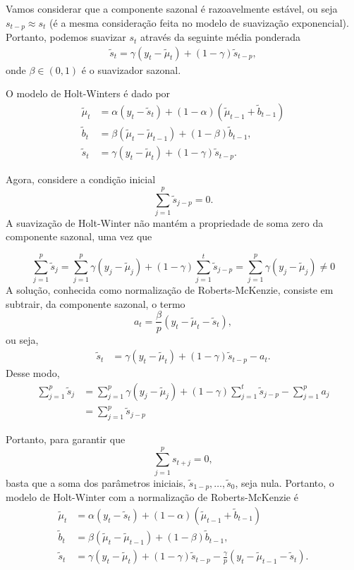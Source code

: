 \documentclass[
  letterpaper,
  DIV=11,
  numbers=noendperiod]{scrartcl}
\theoremstyle{plain}
\theoremstyle{plain}
\theoremstyle{definition}
\theoremstyle{definition}
\theoremstyle{remark}
\begin{document}
Vamos considerar que a componente sazonal é razoavelmente estável, ou
seja \(s_{t-p}\approx s_t\) (é a mesma consideração feita no modelo de
suavização exponencial). Portanto, podemos suavizar \(s_t\) através da
seguinte média ponderada \[\begin{align*}
    \tilde{s}_t = \gamma (y_t - \tilde{\mu}_t) + (1-\gamma) \tilde{s}_{t-p},
    \end{align*}\] onde \(\beta\in(0,1)\) é o suavizador sazonal.

O modelo de Holt-Winters é dado por \[\begin{align*}
    \tilde{\mu}_t &=\alpha (y_t - \tilde{s}_t) + (1-\alpha) (\tilde{\mu}_{t-1}+ \tilde{b}_{t-1}) \\
        \tilde{b}_t &= \beta (\tilde{\mu}_t - \tilde{\mu}_{t-1}) + (1-\beta) \tilde{b}_{t-1}
,\\
    \tilde{s}_t &= \gamma (y_t - \tilde{\mu}_t) + (1-\gamma) \tilde{s}_{t-p}.
    \end{align*}\]

Agora, considere a condição inicial \[\sum_{j=1}^p \tilde{s}_{j-p}=0.\]
A suavização de Holt-Winter não mantém a propriedade de soma zero da
componente sazonal, uma vez que

\[\sum_{j=1}^p \tilde{s}_{j}=\sum_{j=1}^p\gamma(y_j-\tilde{\mu}_j)+(1-\gamma)\sum_{j=1}^t\tilde{s}_{j-p}=\sum_{j=1}^p\gamma(y_j-\tilde{\mu}_j)\neq 0\]
A solução, conhecida como normalização de Roberts-McKenzie, consiste em
subtrair, da componente sazonal, o termo
\[a_t=\frac{\beta}{p}(y_t-\tilde{\mu}_t-\tilde{s}_t),\] ou seja,
\[\begin{align}\tilde{s}_t &= \gamma (y_t - \tilde{\mu}_t) + (1-\gamma) \tilde{s}_{t-p}-a_t.
\end{align}\] Desse modo,
\[\begin{align}\sum_{j=1}^p \tilde{s}_{j}&=\sum_{j=1}^p\gamma(y_j-\tilde{\mu}_j)+(1-\gamma)\sum_{j=1}^t\tilde{s}_{j-p}-\sum_{j=1}^p a_j\\&=\sum_{j=1}^p\tilde{s}_{j-p}\end{align}\]

Portanto, para garantir que \[\sum_{j=1}^p s_{t+j}=0,\] basta que a soma
dos parâmetros iniciais, \(\tilde{s}_{1-p},\ldots,\tilde{s}_0\), seja
nula. Portanto, o modelo de Holt-Winter com a normalização de
Roberts-McKenzie é \[\begin{align*}
    \tilde{\mu}_t &=\alpha (y_t - \tilde{s}_t) + (1-\alpha) (\tilde{\mu}_{t-1}+ \tilde{b}_{t-1}) \\
        \tilde{b}_t &= \beta (\tilde{\mu}_t - \tilde{\mu}_{t-1}) + (1-\beta) \tilde{b}_{t-1}
,\\
    \tilde{s}_t &= \gamma (y_t - \tilde{\mu}_t) + (1-\gamma) \tilde{s}_{t-p}-\frac{\gamma}{p}(y_t-\tilde{\mu}_{t-1}-\tilde{s}_{t}).
    \end{align*}\]
\end{document}
